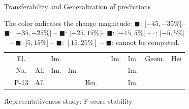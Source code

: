 \documentclass[10pt, export]{beamer}
\begin{document}
\begin{frame}{Transferability and Generalization of predictions}
\begin{table}
\begin{center}
\begin{tabular}{c c| x{.4cm} x{.4cm} x{.4cm} x{.4cm} |x{.4cm} x{.4cm} x{.4cm} x{.55cm} x{.4cm}}
                        \hline
                        &El.   & & Im.& & & &Im. &Im. &Geom. &  Hei\\
                        &Na.   & All& Im.&Im. & & & & Im.&  &\\
                        &P-13   &All & &  &Hei. & & &Im. & &\\
                        \hline
                    \end{tabular}
                    \caption{The color indicates the change magnitude: \textcolor{Moins4}{$\blacksquare$}: $[-45,-35\%[$-- \textcolor{Moins3}{$\blacksquare$}: $[-35,-25\%[$ -- \textcolor{Moins2}{$\blacksquare$}: $[-25,15\%[$-- \textcolor{Moins1}{$\blacksquare$}: $[-15, 5\%[$ -- $\square$: $[-5,5\%[$-- \textcolor{Plus1}{$\blacksquare$}: $[5,15\%[$ -- \textcolor{Plus2}{$\blacksquare$}: $[15,25\%]$ -- $\blacksquare$: cannot be computed.}
                \end{center}
            \end{table}
        \end{frame}
        \begin{frame}{Representativeness study: F-score stability}
            \begin{figure}
                
            \end{figure}
        \end{frame}
\end{document}
